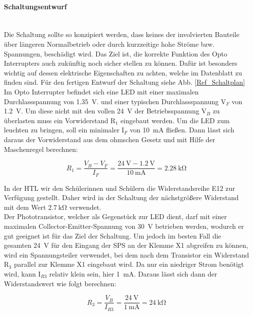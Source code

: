 \paragraph{Schaltungsentwurf} \mbox{}\\
Die Schaltung sollte so konzipiert werden, dass keines der involvierten Bauteile über längeren Normalbetrieb oder durch kurzzeitige hohe Ströme bzw. Spannungen, beschädigt wird. Das Ziel ist, die korrekte Funktion des Opto Interrupters auch zukünftig noch sicher stellen zu können. Dafür ist besonders wichtig auf dessen elektrische Eigenschaften zu achten, welche im Datenblatt zu finden sind. Für den fertigen Entwurf der Schaltung siehe Abb. \ref{Ref_Schaltplan}\\
Im Opto Interrupter befindet sich eine LED mit einer maximalen Durchlassspannung von \qty{1.35}{\volt}. und einer typischen Durchlassspannung V$_{F}$ von \qty{1.2}{\volt}. Um diese nicht mit den vollen \qty{24}{\volt} der Betriebsspannung V$_{B}$ zu überlasten muss ein Vorwiderstand R$_{1}$ eingebaut werden. Um die LED zum leuchten zu bringen, soll ein minimaler I$_{F}$ von \qty{10}{\milli\ampere} fließen. Dann lässt sich daraus der Vorwiderstand aus dem ohmschen Gesetz und mit Hilfe der Maschenregel berechnen:

\begin{equation*}
    R_{1} = \frac{V_{B} - V_{F}}{I_{F}} = \frac{\qty{24}{\volt} - \qty{1.2}{\volt}}{\qty{10}{\milli\ampere}} = \qty{2.28}{\kilo\ohm}
\end{equation*}

In der HTL wir den Schülerinnen und Schülern die Widerstandsreihe E12 zur Verfügung gestellt. Daher wird in der Schaltung der nächstgrößere Widerstand mit dem Wert $\qty{2,7}{\kilo\ohm}$ verwendet.\\
Der Phototransistor, welcher als Gegenstück zur LED dient, darf mit einer maximalen Collector-Emitter-Spannung von \qty{30}{\volt} betrieben werden, wodurch er gut geeignet ist für das Ziel der Schaltung. Um jedoch im besten Fall die gesamten \qty{24}{\volt} für den Eingang der SPS an der Klemme X1 abgreifen zu können, wird ein Spannungsteiler verwendet, bei dem nach dem Transistor ein Widerstand R$_{3}$ parallel zur Klemme X1 eingebaut wird. Da nur ein niedriger Strom benötigt wird, kann I$_{R3}$ relativ klein sein, hier \qty{1}{\milli\ampere}. Daraus lässt sich dann der Widerstandswert wie folgt berechnen:

\begin{equation*}
    R_{3} = \frac{V_{B}}{I_{R3}} = \frac{\qty{24}{\volt}}{\qty{1}{\milli\ampere}} = \qty{24}{\kilo\ohm}
\end{equation*}

